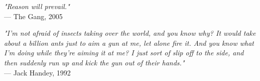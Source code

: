 \begin{flushright}
\emph{"Reason will prevail."}\\
— The Gang, 2005
\end{flushright}
\begin{flushright}
\emph{"I'm not afraid of insects taking over the world, and you know why? It would take about a billion ants just to aim a gun at me, let alone fire it. And you know what I'm doing while they're aiming it at me? I just sort of slip off to the side, and then suddenly run up and kick the gun out of their hands."}\\
— Jack Handey, 1992
\end{flushright}
